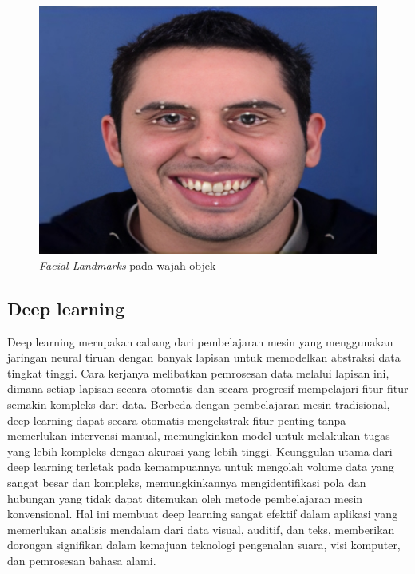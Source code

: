 \begin{figure} [H] \centering
  \includegraphics[scale=0.2]{gambar/2_2_1.png}
  \caption{\emph{Facial Landmarks} pada wajah objek}
  \label{fig:FacialLandmarks}
\end{figure}



\subsection{Deep learning}
\label{subsec:DeepLearning}

Deep learning merupakan cabang dari pembelajaran mesin yang 
menggunakan jaringan neural tiruan dengan banyak lapisan untuk 
memodelkan abstraksi data tingkat tinggi. Cara kerjanya 
melibatkan pemrosesan data melalui lapisan ini, dimana setiap 
lapisan secara otomatis dan secara progresif mempelajari 
fitur-fitur semakin kompleks dari data\parencite{akbulut2017deep}. Berbeda dengan 
pembelajaran mesin tradisional, deep learning dapat secara 
otomatis mengekstrak fitur penting tanpa memerlukan intervensi 
manual, memungkinkan model untuk melakukan tugas yang lebih 
kompleks dengan akurasi yang lebih tinggi. Keunggulan utama dari deep 
learning terletak pada kemampuannya untuk mengolah volume data 
yang sangat besar dan kompleks, memungkinkannya mengidentifikasi 
pola dan hubungan yang tidak dapat ditemukan oleh metode 
pembelajaran mesin konvensional. Hal ini membuat deep learning 
sangat efektif dalam aplikasi yang memerlukan analisis mendalam 
dari data visual, auditif, dan teks, memberikan dorongan 
signifikan dalam kemajuan teknologi pengenalan suara, visi 
komputer, dan pemrosesan bahasa alami.


